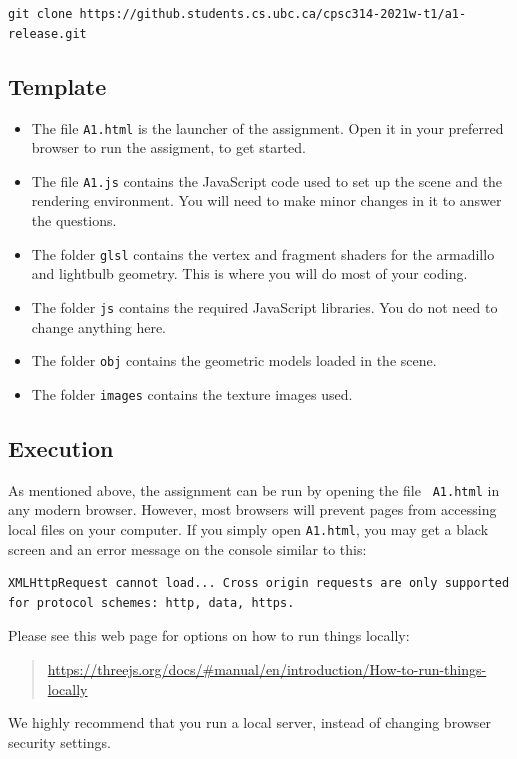 \documentclass[12pt]{exam}
\begin{document}
\medskip
{\tt git clone https://github.students.cs.ubc.ca/cpsc314-2021w-t1/a1-release.git}

\subsection{Template}
\begin{itemize}
\item The file {\tt A1.html} is the launcher of the assignment. Open
  it in your preferred browser to run the assigment, to get started.
\item The file {\tt A1.js} contains the JavaScript code used to set up the scene and the rendering environment. You will need to make minor changes in it to answer the questions.
\item The folder {\tt glsl} contains the vertex and fragment shaders for the armadillo and lightbulb geometry. This is where you will do most of your coding.
\item The folder {\tt js} contains the required JavaScript libraries. You do not need to change anything here.
\item The folder {\tt obj} contains the geometric models loaded in the scene.
\item The folder {\tt images} contains the texture images used.
\end{itemize}

\subsection{Execution}
As mentioned above, the assignment can be run by opening the file {\tt
  A1.html} in any modern browser. However, most browsers will prevent
pages from accessing local files on your computer. If you simply open
{\tt A1.html}, you may get a black screen and an error message on the
console similar to this:
\begin{lstlisting}[style = error]
    XMLHttpRequest cannot load... Cross origin requests are only supported for protocol schemes: http, data, https.
\end{lstlisting}

Please see this web page for options on how to run things locally:
\begin{quotation}
    {\footnotesize \url{https://threejs.org/docs/\#manual/en/introduction/How-to-run-things-locally}}
\end{quotation}

We highly recommend that you run a local server, instead of changing browser security settings.
\end{document}
